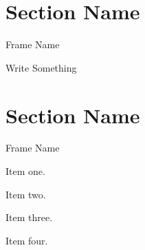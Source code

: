 \documentclass[12pt]{beamer}
\begin{document}
\section{Section Name} 
%	
	\begin{frame}{Frame Name}
		\begin{bbox}{Write Something}
			\blindtext[1]	
		\end{bbox}
	\end{frame}

\section{Section Name}
	\begin{frame}{Frame Name}
		\itemize
			\item Item one.
			\item Item two.
			\item Item three.
			\item Item four.
	\end{frame}
%
\end{document}
